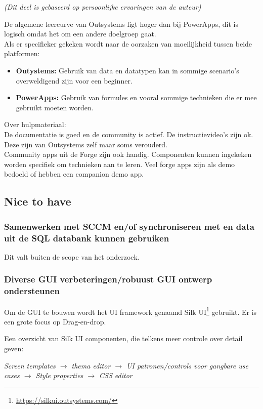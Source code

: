 \textit{(Dit deel is gebaseerd op persoonlijke ervaringen van de auteur)}

De algemene leercurve van Outsystems ligt hoger dan bij PowerApps, dit is logisch omdat het om een andere doelgroep gaat.\\
Als er specifieker gekeken wordt naar de oorzaken van moeilijkheid tussen beide platformen:
\begin{itemize}
    \item \textbf{Outystems:} Gebruik van data en datatypen kan in sommige scenario's overweldigend zijn voor een beginner.
    \item \textbf{PowerApps:} Gebruik van formules en vooral sommige technieken die er mee gebruikt moeten worden.
\end{itemize}

Over hulpmateriaal:\\
De documentatie is goed en de community is actief. De instructievideo's zijn ok. Deze zijn van Outsystems zelf maar soms verouderd.\\
Community apps uit de Forge zijn ook handig. Componenten kunnen ingekeken worden specifiek om technieken aan te leren. Veel forge apps zijn als demo bedoeld of hebben een companion demo app.

\subsection{Nice to have}

\subsubsection{Samenwerken met SCCM en/of synchroniseren met en data uit de SQL databank kunnen gebruiken}

Dit valt buiten de scope van het onderzoek.

\subsubsection{Diverse GUI verbeteringen/robuust GUI ontwerp ondersteunen}

Om de GUI te bouwen wordt het UI framework genaamd Silk UI\footnote{\url{https://silkui.outsystems.com/}} gebruikt. Er is een grote focus op Drag-en-drop.

Een overzicht van Silk UI componenten, die telkens meer controle over detail geven:

\textit{Screen templates $\rightarrow$ thema editor $\rightarrow$ UI patronen/controls voor gangbare use cases $\rightarrow$ Style properties $\rightarrow$ CSS editor}

